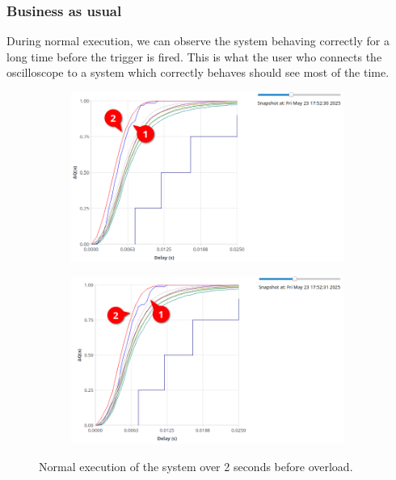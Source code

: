         \subsubsection{Business as usual}
            During normal execution, we can observe the system behaving correctly for a long time before the trigger is fired. This is what the user who connects the oscilloscope to a system which correctly behaves should see most of the time.
        \begin{figure}[H]
            \centering
            \begin{subfigure}{.5\textwidth}
                \centering
                \includegraphics[width=0.98\textwidth]{img/norm_ex_32.png}
                \label{fig:norm_ex_1}
            \end{subfigure}%
            \begin{subfigure}{.5\textwidth}
                \centering
                \includegraphics[width =0.98\textwidth]{img/normal.png}
                \label{fig:norm_ex_2}
            \end{subfigure}
            \label{fig:norm_ex}
            \caption{Normal execution of the system over 2 seconds before overload.}
            \end{figure}
        
